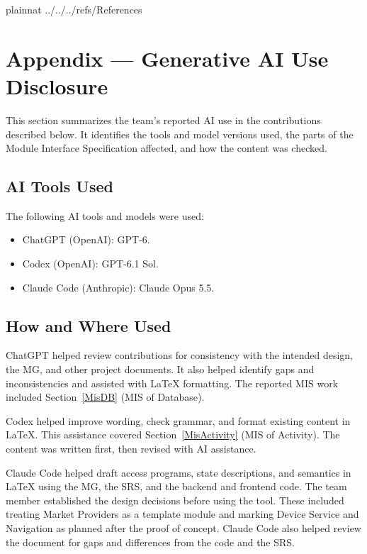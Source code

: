 \documentclass[12pt, titlepage]{article}
\begin{document}
\newpage


 {plainnat}
 {../../../refs/References}

\newpage

\newpage{}

\section{Appendix --- Generative AI Use Disclosure}
This section summarizes the team's reported AI use in the contributions described below. It identifies the tools and model versions used, the parts of the Module Interface Specification affected, and how the content was checked.

\subsection{AI Tools Used}
The following AI tools and models were used: 
\begin{itemize}
  \item ChatGPT (OpenAI): GPT-6.
  \item Codex (OpenAI): GPT-6.1 Sol.
  \item Claude Code (Anthropic): Claude Opus 5.5.
\end{itemize}

\subsection{How and Where Used}
ChatGPT helped review contributions for consistency with the intended design, the MG, and other project documents. It also helped identify gaps and inconsistencies and assisted with LaTeX formatting. The reported MIS work included Section~\ref{MisDB} (MIS of Database). 

\medskip\noindent
Codex helped improve wording, check grammar, and format existing content in LaTeX. This assistance covered Section~\ref{MisActivity} (MIS of Activity). The content was written first, then revised with AI assistance.

\medskip\noindent
Claude Code helped draft access programs, state descriptions, and semantics in LaTeX using the MG, the SRS, and the backend and frontend code. The team member established the design decisions before using the tool. These included treating Market Providers as a template module and marking Device Service and Navigation as planned after the proof of concept. Claude Code also helped review the document for gaps and differences from the code and the SRS. 
\end{document}
